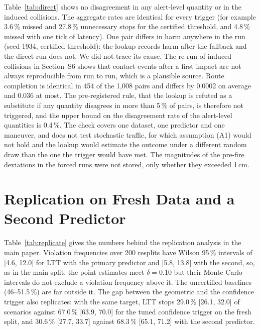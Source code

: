 \documentclass[lettersize,journal]{IEEEtran}
\begin{document}
Table~\ref{tab:direct} shows no disagreement in any alert-level quantity
or in the induced collisions. The aggregate rates are identical for every
trigger (for example 3.6\,\% missed and 27.8\,\% unnecessary stops for the
certified threshold, and 4.8\,\% missed with one tick of latency). One pair
differs in harm anywhere in the run (seed 1934, certified threshold): the
lookup records harm after the fallback and the direct run does not. We did
not trace its cause. The re-run of induced collisions in
Section~S6 shows that contact events after a first impact are not always
reproducible from run to run, which is a plausible source. Route
completion is identical in 454 of the 1{,}008 pairs and differs by 0.0002
on average and 0.036 at most. The pre-registered rule, that the lookup is
refuted as a substitute if any quantity disagrees in more than 5\,\% of
pairs, is therefore not triggered, and the upper bound on the disagreement
rate of the alert-level quantities is 0.4\,\%. The check covers one
dataset, one predictor and one maneuver, and does not test stochastic
traffic, for which assumption (A1) would not hold and the lookup would
estimate the outcome under a different random draw than the one the
trigger would have met. The magnitudes of the pre-fire deviations in the
forced runs were not stored, only whether they exceeded 1\,cm.

\section{Replication on Fresh Data and a Second Predictor}
\label{sec:s-replicate}
Table~\ref{tab:replicate} gives the numbers behind the replication analysis in the main paper.
Violation frequencies over 200 resplits have Wilson 95\,\% intervals of [4.6, 12.0] for LTT with
the primary predictor and [5.8, 13.8] with the second, so, as in the main split, the point
estimates meet $\delta = 0.10$ but their Monte Carlo intervals do not exclude a violation
frequency above it. The uncertified baselines (46--51.5\,\%) are far outside it.
The gap between the geometric and the confidence trigger also replicates:
with the same target, LTT stops 29.0\,\% [26.1, 32.0] of scenarios against
67.0\,\% [63.9, 70.0] for the tuned confidence trigger on the fresh split,
and 30.6\,\% [27.7, 33.7] against 68.3\,\% [65.1, 71.2] with the second
predictor.
\end{document}
